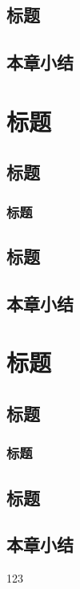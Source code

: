 \section{标题}
\section{本章小结}
\chapter{标题}
\section{标题}
\subsection{标题}
\section{标题}
\section{本章小结}
\chapter{标题}
\section{标题}
\subsection{标题}
\section{标题}
\section{本章小结}

123\cite{CXYY202331031}






